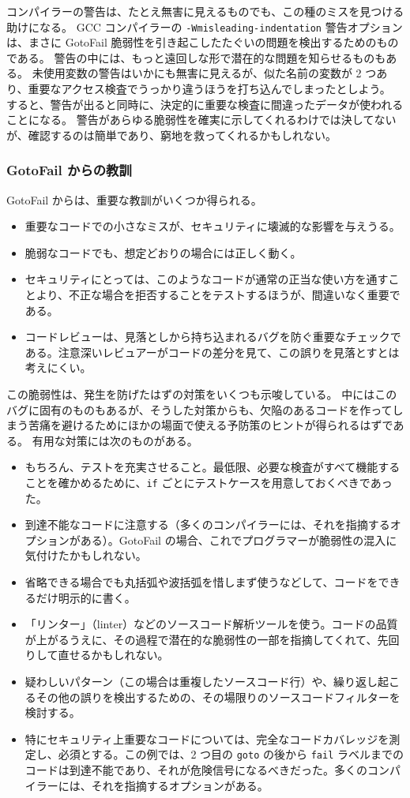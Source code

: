 \documentclass[uplatex]{jsarticle}
\begin{document}
コンパイラーの警告は、たとえ無害に見えるものでも、この種のミスを見つける助けになる。
GCC コンパイラーの \texttt{-Wmisleading-indentation} 警告オプションは、まさに GotoFail 脆弱性を引き起こしたたぐいの問題を検出するためのものである。
警告の中には、もっと遠回しな形で潜在的な問題を知らせるものもある。
未使用変数の警告はいかにも無害に見えるが、似た名前の変数が 2 つあり、重要なアクセス検査でうっかり違うほうを打ち込んでしまったとしよう。
すると、警告が出ると同時に、決定的に重要な検査に間違ったデータが使われることになる。
警告があらゆる脆弱性を確実に示してくれるわけでは決してないが、確認するのは簡単であり、窮地を救ってくれるかもしれない。

\subsubsection{GotoFail からの教訓}

GotoFail からは、重要な教訓がいくつか得られる。
\begin{itemize}
\item 重要なコードでの小さなミスが、セキュリティに壊滅的な影響を与えうる。
\item 脆弱なコードでも、想定どおりの場合には正しく動く。
\item セキュリティにとっては、このようなコードが通常の正当な使い方を通すことより、不正な場合を拒否することをテストするほうが、間違いなく重要である。
\item コードレビューは、見落としから持ち込まれるバグを防ぐ重要なチェックである。注意深いレビュアーがコードの差分を見て、この誤りを見落とすとは考えにくい。
\end{itemize}

この脆弱性は、発生を防げたはずの対策をいくつも示唆している。
中にはこのバグに固有のものもあるが、そうした対策からも、欠陥のあるコードを作ってしまう苦痛を避けるためにほかの場面で使える予防策のヒントが得られるはずである。
有用な対策には次のものがある。
\begin{itemize}
\item もちろん、テストを充実させること。最低限、必要な検査がすべて機能することを確かめるために、\texttt{if} ごとにテストケースを用意しておくべきであった。
\item 到達不能なコードに注意する（多くのコンパイラーには、それを指摘するオプションがある）。GotoFail の場合、これでプログラマーが脆弱性の混入に気付けたかもしれない。
\item 省略できる場合でも丸括弧や波括弧を惜しまず使うなどして、コードをできるだけ明示的に書く。
\item 「リンター」（linter）などのソースコード解析ツールを使う。コードの品質が上がるうえに、その過程で潜在的な脆弱性の一部を指摘してくれて、先回りして直せるかもしれない。
\item 疑わしいパターン（この場合は重複したソースコード行）や、繰り返し起こるその他の誤りを検出するための、その場限りのソースコードフィルターを検討する。
\item 特にセキュリティ上重要なコードについては、完全なコードカバレッジを測定し、必須とする。この例では、2 つ目の \texttt{goto} の後から \texttt{fail} ラベルまでのコードは到達不能であり、それが危険信号になるべきだった。多くのコンパイラーには、それを指摘するオプションがある。
\end{itemize}
\end{document}
